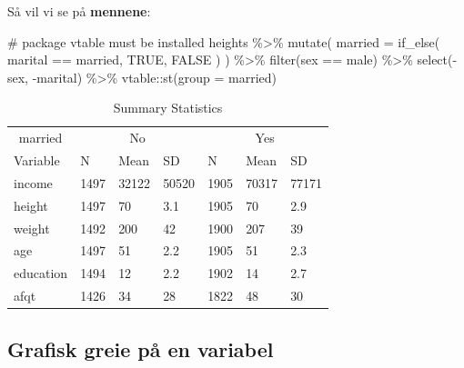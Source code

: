 \documentclass[
  letterpaper,
  DIV=11,
  numbers=noendperiod]{scrartcl}
\newenvironment{Shaded}{\begin{snugshade}}{\end{snugshade}}
\newcommand{\AttributeTok}[1]{\textcolor[rgb]{0.40,0.45,0.13}{#1}}
\newcommand{\CommentTok}[1]{\textcolor[rgb]{0.37,0.37,0.37}{#1}}
\newcommand{\ConstantTok}[1]{\textcolor[rgb]{0.56,0.35,0.01}{#1}}
\newcommand{\FunctionTok}[1]{\textcolor[rgb]{0.28,0.35,0.67}{#1}}
\newcommand{\NormalTok}[1]{\textcolor[rgb]{0.00,0.23,0.31}{#1}}
\newcommand{\SpecialCharTok}[1]{\textcolor[rgb]{0.37,0.37,0.37}{#1}}
\newcommand{\StringTok}[1]{\textcolor[rgb]{0.13,0.47,0.30}{#1}}
\begin{document}
Så vil vi se på \textbf{mennene}:

\begin{Shaded}
\begin{Highlighting}[]
\CommentTok{\# package vtable must be installed}
\NormalTok{heights }\SpecialCharTok{\%\textgreater{}\%} 
  \FunctionTok{mutate}\NormalTok{(}
    \AttributeTok{married =} \FunctionTok{if\_else}\NormalTok{(}
\NormalTok{    marital }\SpecialCharTok{==} \StringTok{\textquotesingle{}married\textquotesingle{}}\NormalTok{, }
    \ConstantTok{TRUE}\NormalTok{,}
    \ConstantTok{FALSE}
\NormalTok{    )}
\NormalTok{  ) }\SpecialCharTok{\%\textgreater{}\%} 
  \FunctionTok{filter}\NormalTok{(sex }\SpecialCharTok{==} \StringTok{\textquotesingle{}male\textquotesingle{}}\NormalTok{) }\SpecialCharTok{\%\textgreater{}\%} 
  \FunctionTok{select}\NormalTok{(}\SpecialCharTok{{-}}\NormalTok{sex, }\SpecialCharTok{{-}}\NormalTok{marital) }\SpecialCharTok{\%\textgreater{}\%} 
\NormalTok{  vtable}\SpecialCharTok{::}\FunctionTok{st}\NormalTok{(}\AttributeTok{group =} \StringTok{\textquotesingle{}married\textquotesingle{}}\NormalTok{)}
\end{Highlighting}
\end{Shaded}

\begin{table}

\caption{Summary Statistics}
\centering
\begin{tabular}[t]{lllllll}
\toprule
\multicolumn{1}{c}{married} & \multicolumn{3}{c}{No} & \multicolumn{3}{c}{Yes} \\
\cmidrule(l{3pt}r{3pt}){1-1} \cmidrule(l{3pt}r{3pt}){2-4} \cmidrule(l{3pt}r{3pt}){5-7}
Variable & N & Mean & SD & N & Mean & SD\\
\midrule
income & 1497 & 32122 & 50520 & 1905 & 70317 & 77171\\
height & 1497 & 70 & 3.1 & 1905 & 70 & 2.9\\
weight & 1492 & 200 & 42 & 1900 & 207 & 39\\
age & 1497 & 51 & 2.2 & 1905 & 51 & 2.3\\
education & 1494 & 12 & 2.2 & 1902 & 14 & 2.7\\
\addlinespace
afqt & 1426 & 34 & 28 & 1822 & 48 & 30\\
\bottomrule
\end{tabular}
\end{table}

\hypertarget{grafisk-greie-puxe5-en-variabel}{%
\subsection{Grafisk greie på en
variabel}\label{grafisk-greie-puxe5-en-variabel}}
\end{document}
